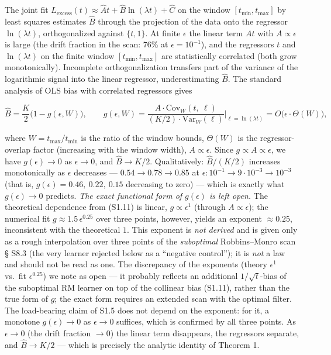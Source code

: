 \documentclass[12pt]{iopart}
\begin{document}
The joint fit \(L_{\text{excess}}(t) \approx \hat A t + \hat B\ln(\lambda t) + \hat C\) on the window \([t_{\min}, t_{\max}]\) by least squares estimates \(\hat B\) through the projection of the data onto the regressor \(\ln(\lambda t)\), orthogonalized against \(\{t, 1\}\). At finite \(\epsilon\) the linear term \(A t\) with \(A \propto \epsilon\) is large (the drift fraction in the scan: 76\% at \(\epsilon = 10^{-1}\)), and the regressors \(t\) and \(\ln(\lambda t)\) on the finite window \([t_{\min}, t_{\max}]\) are statistically correlated (both grow monotonically). Incomplete orthogonalization transfers part of the variance of the logarithmic signal into the linear regressor, underestimating \(\hat B\). The standard analysis of OLS bias with correlated regressors gives



\begin{equation}\hat B = \frac{K}{2}\big(1 - g(\epsilon, W)\big), \qquad g(\epsilon, W) = \frac{A\cdot\mathrm{Cov}_W(t,\ \ell)}{(K/2)\cdot\mathrm{Var}_W(\ell)}\bigg|_{\ell = \ln(\lambda t)} = O\big(\epsilon\cdot\Theta(W)\big), \tag{S1.11}\end{equation}



where \(W = t_{\max}/t_{\min}\) is the ratio of the window bounds, \(\Theta(W)\) is the regressor-overlap factor (increasing with the window width), \(A \propto \epsilon\). Since \(g \propto A \propto \epsilon\), we have \(g(\epsilon) \to 0\) as \(\epsilon \to 0\), and \(\hat B \to K/2\). Qualitatively: \(\hat B/(K/2)\) increases monotonically as \(\epsilon\) decreases --- \(0.54 \to 0.78 \to 0.85\) at \(\epsilon: 10^{-1} \to 9\cdot10^{-3} \to 10^{-3}\) (that is, \(g(\epsilon) = 0.46,\ 0.22,\ 0.15\) decreasing to zero) --- which is exactly what \(g(\epsilon) \to 0\) predicts. \emph{The exact functional form of \(g(\epsilon)\) is left open.} The theoretical dependence from (S1.11) is linear, \(g \propto \epsilon^1\) (through \(A \propto \epsilon\)); the numerical fit \(g \approx 1.5\,\epsilon^{0.25}\) over three points, however, yields an exponent \(\approx 0.25\), inconsistent with the theoretical \(1\). This exponent is \emph{not derived} and is given only as a rough interpolation over three points of the \emph{suboptimal} Robbins--Monro scan § S8.3 \cite{Andriishin2026b} (the very learner rejected below as a ``negative control''); it is \emph{not} a law and should not be read as one. The discrepancy of the exponents (theory \(\epsilon^1\) vs.~fit \(\epsilon^{0.25}\)) we note as open --- it probably reflects an additional \(1/\sqrt t\)-bias of the suboptimal RM learner on top of the collinear bias (S1.11), rather than the true form of \(g\); the exact form requires an extended scan with the optimal filter. The load-bearing claim of S1.5 does not depend on the exponent: for it, a monotone \(g(\epsilon) \to 0\) as \(\epsilon \to 0\) suffices, which is confirmed by all three points. As \(\epsilon \to 0\) (the drift fraction \(\to 0\)) the linear term disappears, the regressors separate, and \(\hat B \to K/2\) --- which is precisely the analytic identity of Theorem 1.
\end{document}
